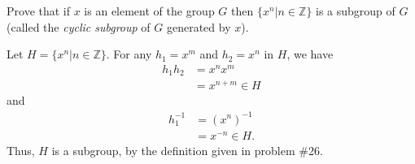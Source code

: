 \documentclass[12 pt, letterpaper]{hmcpset}
\begin{document}
\pagebreak

\begin{problem}
	Prove that if $x$ is an element of the group $G$ then $\{ x^n | n \in \mathbb Z \}$ is a subgroup of $G$ (called the \textit{cyclic subgroup} of $G$ generated by $x$).
\end{problem}

\begin{solution}
	Let $H = \{ x^n | n \in \mathbb Z \}$. For any $h_1 = x^m$ and $h_2 = x^n$ in $H$, we have
	\[
		\begin{split}
			h_1 h_2 & = x^n x^m \\
				& = x^{n + m} \in H
		\end{split}
	\]
	and
	\[
		\begin{split}
			h_1^{-1} & = (x^n)^{-1} \\
				 & = x^{-n} \in H.
		\end{split}
	\]
	Thus, $H$ is a subgroup, by the definition given in problem \#26.
\end{solution}
\end{document}

